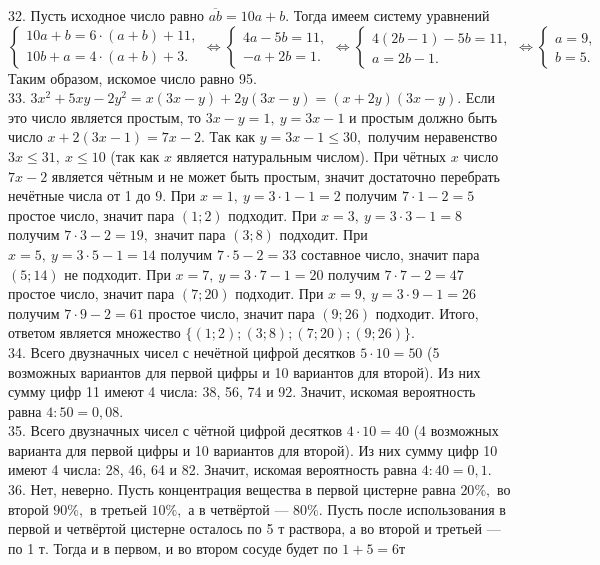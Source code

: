 32. Пусть исходное число равно $\overline{ab}=10a+b.$ Тогда имеем систему уравнений \\$\begin{cases} 10a+b=6\cdot(a+b)+11,\\ 10b+a=4\cdot(a+b)+3.\end{cases}\Leftrightarrow \begin{cases} 4a-5b=11,\\ -a+2b=1.\end{cases}\Leftrightarrow \begin{cases} 4(2b-1)-5b=11,\\ a=2b-1.\end{cases}
\Leftrightarrow \begin{cases} a=9,\\ b=5.\end{cases}$ Таким образом, искомое число равно 95.\\
33. $3x^2+5xy-2y^2=x(3x-y)+2y(3x-y)=(x+2y)(3x-y).$ Если это число является простым, то $3x-y=1,\ y=3x-1$ и простым должно быть число $x+2(3x-1)=7x-2.$ Так как $y=3x-1\leqslant30,$ получим неравенство $3x\leqslant31,\ x\leqslant 10$ (так как $x$ является натуральным числом). При чётных $x$ число $7x-2$ является чётным и не может быть простым, значит достаточно перебрать нечётные числа от 1 до 9. При $x=1,\ y=3\cdot1-1=2$ получим $7\cdot1-2=5$ простое число, значит пара $(1;2)$ подходит. При $x=3,\ y=3\cdot3-1=8$ получим $7\cdot3-2=19,$ значит пара $(3;8)$ подходит. При $x=5,\ y=3\cdot5-1=14$ получим $7\cdot5-2=33$ составное число, значит пара $(5;14)$ не подходит. При $x=7,\ y=3\cdot7-1=20$ получим $7\cdot7-2=47$ простое число, значит пара $(7;20)$ подходит. При $x=9,\ y=3\cdot9-1=26$ получим $7\cdot9-2=61$ простое число, значит пара $(9;26)$ подходит. Итого, ответом является множество $\{(1;2); (3;8); (7;20); (9;26)\}.$\\
34. Всего двузначных чисел с нечётной цифрой десятков $5\cdot10=50$ (5 возможных вариантов для первой цифры и 10 вариантов для второй). Из них сумму цифр 11 имеют
4 числа: 38, 56, 74 и 92. Значит, искомая вероятность равна $4:50=0,08.$\\
35. Всего двузначных чисел с чётной цифрой десятков $4\cdot10=40$ (4 возможных варианта для первой цифры и 10 вариантов для второй). Из них сумму цифр 10 имеют
4 числа: 28, 46, 64 и 82. Значит, искомая вероятность равна $4:40=0,1.$\\
36. Нет, неверно. Пусть концентрация вещества в первой цистерне равна $20\%,$ во второй $90\%,$ в третьей $10\%,$ а в четвёртой --- $80\%.$ Пусть после использования в первой и четвёртой цистерне осталось по 5 т раствора, а во второй и третьей --- по 1 т. Тогда и в первом, и во втором сосуде будет по $1+5=6$т

